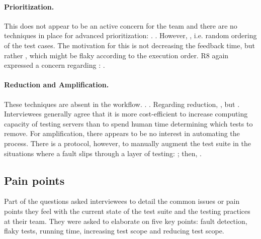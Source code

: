 \paragraph{Prioritization.} This does not appear to be an active concern for the team and there are no techniques in place for advanced prioritization: .
.
However, , i.e. random ordering of the test cases.
The motivation for this is not decreasing the feedback time, but rather , which might be flaky according to the execution order.
R8 again expressed a concern regarding \tcp: .

\paragraph{Reduction and Amplification.} These techniques are absent in the workflow. . .
Regarding reduction, , but .
Interviewees generally agree that it is more cost-efficient to increase computing capacity of testing servers than to spend human time determining which tests to remove.
For amplification, there appears to be no interest in automating the process.
There is a protocol, however, to manually augment the test suite in the situations where a fault slips through a layer of testing: ; then, .

\subsection{Pain points}

Part of the questions asked interviewees to detail the common issues or pain points they feel with the current state of the test suite and the testing practices at their team.
They were asked to elaborate on five key points: fault detection, flaky tests, running time, increasing test scope and reducing test scope.

